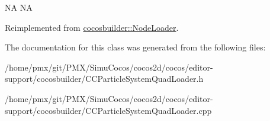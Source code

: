 NA  NA 

Reimplemented from \hyperlink{classcocosbuilder_1_1NodeLoader}{cocosbuilder\+::\+Node\+Loader}.



The documentation for this class was generated from the following files\+:\begin{DoxyCompactItemize}
\item 
/home/pmx/git/\+P\+M\+X/\+Simu\+Cocos/cocos2d/cocos/editor-\/support/cocosbuilder/C\+C\+Particle\+System\+Quad\+Loader.\+h\item 
/home/pmx/git/\+P\+M\+X/\+Simu\+Cocos/cocos2d/cocos/editor-\/support/cocosbuilder/C\+C\+Particle\+System\+Quad\+Loader.\+cpp\end{DoxyCompactItemize}
